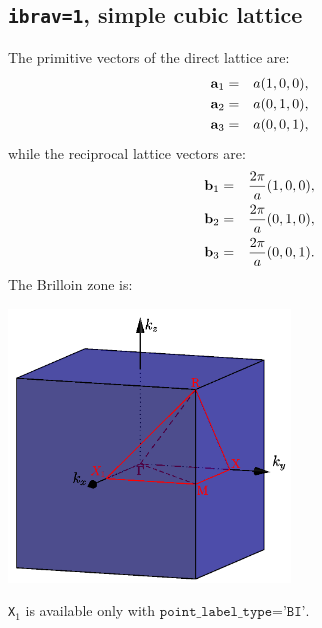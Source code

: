 \documentclass[12pt,a4paper]{article}
\begin{document}
\subsection{\texttt{ibrav=1}, simple cubic lattice}
The primitive vectors of the direct lattice are:
\begin{eqnarray}
{\bf a}_1 &=& a (1, 0, 0), \nonumber \\
{\bf a}_2 &=& a (0, 1, 0), \nonumber \\
{\bf a}_3 &=& a (0, 0, 1), \nonumber
\nonumber
\end{eqnarray}
while the reciprocal lattice vectors are:
\begin{eqnarray}
{\bf b}_1 &=& {2\pi \over a} (1, 0, 0), \nonumber \\
{\bf b}_2 &=& {2\pi \over a} (0, 1, 0), \nonumber \\
{\bf b}_3 &=& {2\pi \over a} (0, 0, 1). \nonumber
\nonumber
\end{eqnarray}
The Brilloin zone is:
\begin{center}
\includegraphics[width=7.5cm,angle=0]{images/cubic_bi.png}
\end{center}
\texttt{X$_1$} is available only with $\texttt{point\_label\_type='BI'}$.
\end{document}
